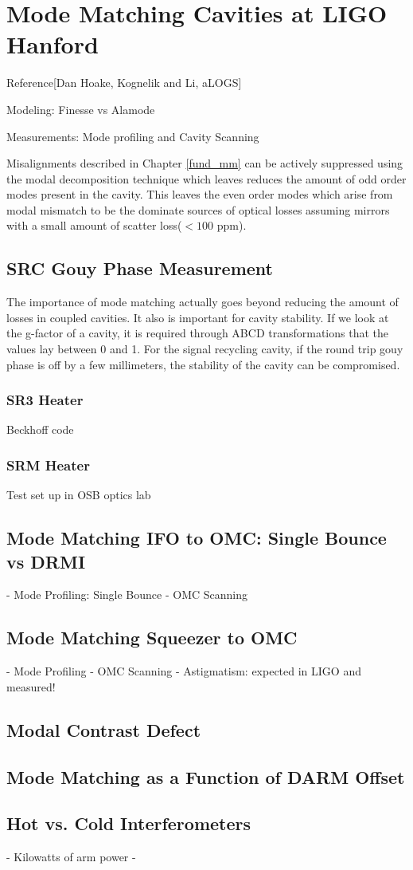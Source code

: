 \chapter{Mode Matching Cavities at LIGO Hanford}
	Reference[Dan Hoake, Kognelik and Li, aLOGS]
	
	Modeling: Finesse vs Alamode
	
	Measurements: Mode profiling and Cavity Scanning
	
	Misalignments described in Chapter \ref{fund_mm} can be actively suppressed using the modal decomposition technique which leaves reduces the amount of odd order modes present in the cavity.  This leaves the even order modes which arise from modal mismatch to be the dominate sources of optical losses assuming mirrors with a small amount of scatter loss($<100$ ppm).

	
	\section{SRC Gouy Phase Measurement}
	The importance of mode matching actually goes beyond reducing the amount of losses in coupled cavities.  It also is important for cavity stability.  If we look at the g-factor of a cavity, it is required through ABCD transformations that the values lay between 0 and 1.  For the signal recycling cavity, if the round trip gouy phase is off by a few millimeters, the stability of the cavity can be compromised. 
	
	\subsection{SR3 Heater}
	Beckhoff code
	

	\subsection{SRM Heater}
	Test set up in OSB optics lab
	
	
	\section{Mode Matching IFO to OMC: Single Bounce vs DRMI}
	- Mode Profiling: Single Bounce
	- OMC Scanning
	
	
	\section{Mode Matching Squeezer to OMC}
	- Mode Profiling
	- OMC Scanning
	- Astigmatism: expected in LIGO and measured!

	\section{Modal Contrast Defect}
	
	\section{Mode Matching as a Function of DARM Offset}
	
	\section{Hot vs. Cold Interferometers}
	- Kilowatts of arm power
	- 